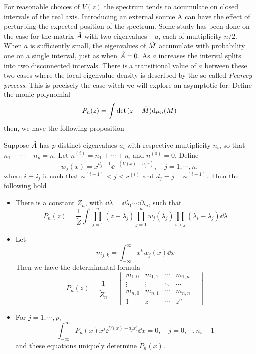  For reasonable choices of $V(z)$ the spectrum tends to accumulate on closed intervals of the real axis. Introducing an external source A can have the effect of perturbing the expected position of the spectrum. Some study has been done on the case for the matrix $\hat A$ with two eigenvalues $\pm a$, each of multiplicity $n/2$. When $a$ is sufficiently small, the eigenvalues of $\hat M$ accumulate with probability one on a single interval, just as when $\hat A = 0$. As $a$ increases the interval splits into two disconnected intervals. There is a transitional value of $a$ between these two cases where the local eigenvalue density is described by the so-called \textit{Pearcey process}. This is precisely the case witch we will explore an asymptotic for. Define the monic polynomial
\begin{equation}
	P_n(z) = \int \det{(z - \hat M)} \mathrm{d} \mu_n(M)	
\end{equation}
then, we have the following proposition
\begin{prop} Suppose $\hat A$ has $p$ distinct eigenvalues $a_i$ with respective multiplicity $n_i$, so that $n_1 + \cdots + n_p = n$. Let $n^{(i)} = n_1 + \cdots + n_i$ and $n^{(0)} = 0$. Define
	\begin{equation}
		w_j(x) = x^{d_j -1} \ee^{-(V(x) - a_j x)}, \quad j = 1, \cdots, n.
	\end{equation}
	where $i = i_j$ is such that $n^{(i-1)} < j < n^{(i)}$ and $d_j = j - n^{(i-1)}$. Then the following hold
	\begin{itemize}
		\item There is a constant $\tilde{Z}_n$, with $\dd \lambda = \dd \lambda_1 \cdots \dd \lambda_n$, such that
		\begin{equation}
			P_n(z) = \frac{1}{\tilde{Z}} \int \prod_{j=1}^{n} (z - \lambda_j) \prod_{j=1}^{n} w_j(\lambda_j) \prod_{i > j} (\lambda_i - \lambda_j) \dd \lambda
		\end{equation}
		\item Let 
		\begin{equation}
			m_{j,k} = \int_{-\infty}^{\infty} x^k w_j(x) \dd x
		\end{equation} 
		Then we have the determinantal formula
		\begin{equation}
			P_n(z) = \frac{1}{\tilde{Z}_n} = 
			\begin{vmatrix}
				m_{1,0} & m_{1,1} & \cdots & m_{1,n}\\
				\vdots & \vdots & \ddots & \cdots \\
				m_{n,0} & m_{n,1} & \cdots & m_{n,n} & \\
				1 & z & \cdots & z^n
			\end{vmatrix}
		\end{equation}
		\item For $j = 1, \cdots, p$,
		\begin{equation}
			\int_{-\infty}^{\infty} P_n(x) x^j  \ee^{V(x) - a_j x)} \dd x = 0, \quad j = 0, \cdots, n_i-1
		\end{equation}
		and these equations uniquely determine $P_n(x)$.
	\end{itemize}
\end{prop}

